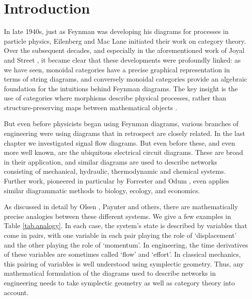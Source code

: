 \section{Introduction}\label{sec:intro}
In late 1940s, just as Feynman was developing his diagrams for processes in
particle physics, Eilenberg and Mac Lane initiated their work on category
theory.  Over the subsequent decades, and especially in the aforementioned work
of Joyal and Street \cite{JS91,JS93}, it became clear that these developments were
profoundly linked: as we have seen, monoidal categories have a precise graphical
representation in terms of string diagrams, and conversely monoidal categories
provide an algebraic foundation for the intuitions behind Feynman diagrams.  The
key insight is the use of categories where morphisms describe physical
processes, rather than structure-preserving maps between mathematical objects
\cite{BaezStay,CP}.

But even before physicists began using Feynman diagrams, various branches of
engineering were using diagrams that in retrospect are closely related. In the
last chapter we investigated signal flow diagrams. But even before these, and
even more well known, are the ubiquitous electrical circuit diagrams. These are
broad in their application, and similar diagrams are used to describe networks
consisting of mechanical, hydraulic, thermodynamic and chemical systems.
Further work, pioneered in particular by Forrester \cite{Fo} and Odum \cite{Od},
even applies similar diagrammatic methods to biology, ecology, and economics.

As discussed in detail by Olsen \cite{Ol}, Paynter \cite{Pa} and others, there
are mathematically precise analogies between these different systems. We give a
few examples in Table \ref{tab.analogy}. In each case, the system's state is
described by variables that come in pairs, with one variable in each pair
playing the role of  `displacement' and the other playing the role of
`momentum'.  In engineering, the time derivatives of these variables are
sometimes called `flow' and `effort'.    In classical mechanics, this pairing of
variables is well understood using symplectic geometry.  Thus, any mathematical
formulation of the diagrams used to describe networks in engineering needs to
take symplectic geometry as well as category theory into account. 


